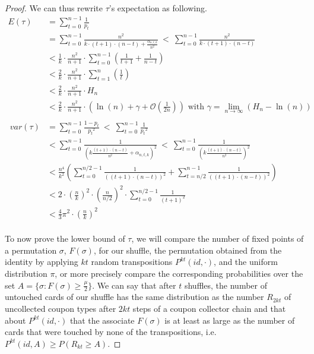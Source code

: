\documentclass[a4paper]{article}
\begin{document}
\begin{proof}
We can thus rewrite $\tau$'s expectation as following.
\begin{align*}
 E(\tau) &= \sum_{t=0}^{n-1} \frac{1}{p_{t}} &\\
 &= \sum_{t=0}^{n-1} \frac{n^2}{k \cdot (t+1)\cdot(n-t) + \frac{\alpha_{n,t,k}}{n^2}}\ <\  \sum_{t=0}^{n-1} \frac{n^2}{k \cdot (t+1)\cdot(n-t)}  &\\
 &< \frac{1}{k} \cdot \frac{n^2}{n+1} \cdot  \sum_{t=0}^{n-1} \left ( \frac{1}{t+1} + \frac{1}{n-t} \right ) &\\
 &< \frac{2}{k} \cdot \frac{n^2}{n+1} \cdot \sum_{t=1}^{n} \left ( \frac{1}{t} \right ) &\\
 &< \frac{2}{k} \cdot \frac{n^2}{n+1} \cdot H_n &\\
 &< \frac{2}{k} \cdot \frac{n^2}{n+1} \cdot \left( \ln(n) + \gamma +\mathcal{O}(\frac{1}{2n}) \right ) \text{ with } \gamma = \lim_{n \to \infty} \left ( H_n - \ln(n) \right ) & \\
\\\
 var(\tau) &= \sum_{t=0}^{n-1}\frac{1-p_t}{{p_t}^2}\ <\  \sum_{t=0}^{n-1}\frac{1}{{p_t}^2} &\\
 &< \sum_{t=0}^{n-1}\frac{1}{\left ( k \frac{(t+1)\cdot(n-t)}{n^2} + \alpha_{n,t,k}\right )^2}\ <\ \sum_{t=0}^{n-1} \frac{1 }{\left ( k \frac{(t+1)\cdot(n-t)}{n^2} \right )^2} &\\
 &< \frac{n^4}{k^2} \left ( \sum_{t=0}^{n/2-1} \frac{1}{\left ( (t+1)\cdot(n-t)\right )^2}  + \sum_{t=n/2}^{n-1} \frac{1}{\left ( (t+1)\cdot(n-t)\right )^2} \right ) &\\
 &< 2 \cdot \left (\frac{n}{k} \right )^2 \cdot \left (\frac{n}{n/2} \right )^2 \cdot \sum_{t=0}^{n/2-1} \frac{1}{(t+1)^2} &\\
 &< \frac{4}{3} \pi^2 \cdot \left (\frac{n}{k} \right )^2 
\end{align*}
\\

To now prove the lower bound of $\tau$, we will compare the number of fixed points of a permutation $\sigma$, $F(\sigma)$, for our shuffle, the permutation
obtained from the identity by applying $kt$ random transpositions $ P^{kt}(id, \cdot)$, and the uniform distribution $\pi$, or more precisely compare the corresponding probabilities over the set $A=\{\sigma : F(\sigma) \geq \frac{\mu}{2} \}$.
We can say that after $t$ shuffles, the number of untouched cards of our shuffle has the same distribution as the number $R_{2kt}$ of uncollected coupon types after $2kt$ steps of a coupon collector chain
and that about $ P^{kt}(id, \cdot)$ that the associate $F(\sigma)$ is at least as large as the number of cards that were touched by none of the transpositions, i.e. $P^{kt}(id,A) \geq P(R_{kt}\geq A) $.


\end{proof}
\end{document}
